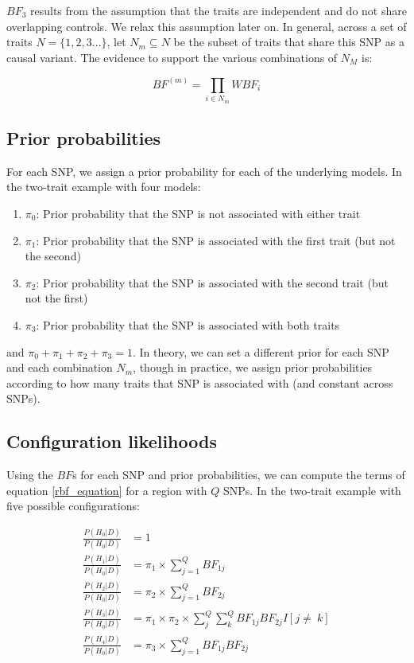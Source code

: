 \documentclass{article}
\begin{document}
\noindent $BF_3$ results from the assumption that the traits are independent and do not share overlapping controls. We relax this assumption later on. In general, across a set of traits $N = \big\{1,2,3...\big\}$, let $N_m \subseteq N$ be the subset of traits that share this SNP as a causal variant. The evidence to support the various combinations of $N_M$ is:

\begin{equation}
BF^{(m)} = \prod_{i \in N_m} WBF_i
\end{equation}


\subsection{Prior probabilities}
For each SNP, we assign a prior probability for each of the underlying models. In the two-trait example with four models:
\begin{enumerate}[start=0]
  \item $\pi_0$: Prior probability that the SNP is not associated with either trait
  \item $\pi_1$: Prior probability that the SNP is associated with the first trait (but not the second)
  \item $\pi_2$: Prior probability that the SNP is associated with the second trait (but not the first)
  \item $\pi_3$: Prior probability that the SNP is associated with both traits
\end{enumerate}

\noindent and $\pi_0 + \pi_1 + \pi_2 + \pi_3 = 1$. In theory, we can set a different prior for each SNP and each combination $N_m$, though in practice, we assign prior probabilities according to how many traits that SNP is associated with (and constant across SNPs). 

\subsection{Configuration likelihoods}
Using the $BF$s for each SNP and prior probabilities, we can compute the terms of equation \ref{rbf_equation} for a region with $Q$ SNPs. In the two-trait example with five possible configurations:

\begin{align}
\frac{P(H_0|D)}{P(H_0|D)} & = 1 \\
\frac{P(H_1|D)}{P(H_0|D)} & = \pi_1 \times \sum_{j=1}^Q BF_{1j} \\
\frac{P(H_2|D)}{P(H_0|D)} & = \pi_2 \times \sum_{j=1}^Q BF_{2j} \\
\label{h3}
\frac{P(H_3|D)}{P(H_0|D)} & = \pi_1 \times \pi_2 \times \sum_{j}^Q \sum_{k}^Q BF_{1j} BF_{2j} I[j \ne\ k] \\
\frac{P(H_4|D)}{P(H_0|D)} & = \pi_{3} \times \sum_{j=1}^Q BF_{1j} BF_{2j}
\end{align}
\end{document}
